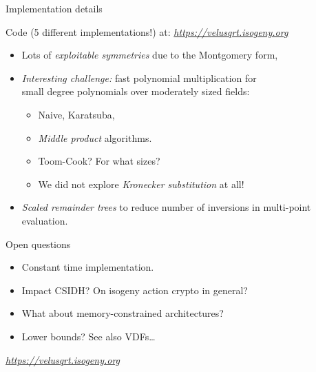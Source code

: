 \documentclass[aspectratio=169]{beamer}
\begin{document}

\begin{frame}{Implementation details}
  \large
  
  Code (5 different implementations!) at: \emph{\url{https://velusqrt.isogeny.org}}

  \medskip
  \begin{itemize}
  \item Lots of \emph{exploitable symmetries} due to the Montgomery
    form,
  \item \emph{Interesting challenge:} fast polynomial multiplication for\\
    small degree polynomials over moderately sized fields:
    \begin{itemize}
    \item Naive, Karatsuba,
    \item \emph{Middle product} algorithms.
    \item Toom-Cook? For what sizes?
    \item We did not explore \emph{Kronecker substitution} at all!
    \end{itemize}
  \item \emph{Scaled remainder trees} to reduce number of
    inversions in multi-point evaluation.
  \end{itemize}
\end{frame}


\begin{frame}{Open questions}
  \large
  \begin{itemize}
  \item Constant time implementation.
  \item Impact CSIDH? On isogeny action crypto in general?
  \item What about memory-constrained architectures?
  \item Lower bounds? See also VDFs\dots
  \end{itemize}

  \bigskip
  \centering
  \emph{\url{https://velusqrt.isogeny.org}}
\end{frame}

\end{document}
